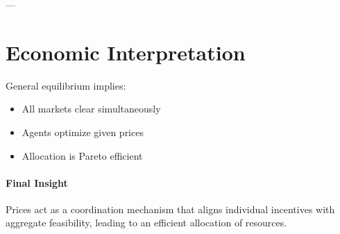---

\section{Economic Interpretation}

General equilibrium implies:
\begin{itemize}
    \item All markets clear simultaneously
    \item Agents optimize given prices
    \item Allocation is Pareto efficient
\end{itemize}

\paragraph{Final Insight}
Prices act as a coordination mechanism that aligns individual incentives with
aggregate feasibility, leading to an efficient allocation of resources.